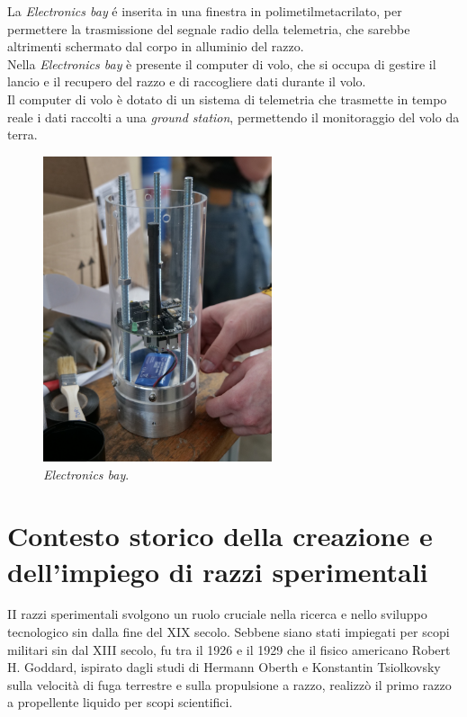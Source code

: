 \documentclass[12pt,a4paper,twoside]{book}
\begin{document}
La \emph{Electronics bay} \'e inserita in una finestra in polimetilmetacrilato, 
per permettere la trasmissione del segnale radio della telemetria, che sarebbe 
altrimenti schermato dal corpo in alluminio del razzo. \\

Nella \emph{Electronics bay} è presente il computer di volo, che si occupa di
gestire il lancio e il recupero del razzo e di raccogliere dati durante il volo. \\
Il computer di volo è dotato di un sistema di telemetria che trasmette in tempo
reale i dati raccolti a una \emph{ground station}, permettendo il monitoraggio
del volo da terra.

\begin{figure}[H]
    \centering
    \includegraphics[width=0.6\textwidth]{img/electronics-bay.jpg}
    \caption{\emph{Electronics bay}.}
    \label{fig:electronics-bay}
\end{figure}

\section{Contesto storico della creazione e dell'impiego di razzi sperimentali}
II razzi sperimentali svolgono un ruolo cruciale nella ricerca e nello sviluppo
tecnologico sin dalla fine del XIX secolo.
Sebbene siano stati impiegati per scopi militari sin dal XIII secolo, fu tra il
1926 e il 1929 che il fisico americano Robert H. Goddard, ispirato dagli studi
di Hermann Oberth e Konstantin Tsiolkovsky sulla velocità di fuga terrestre e
sulla propulsione a razzo, realizzò il primo razzo a propellente liquido per
scopi scientifici\cite{seibert2006history}.
\end{document}
